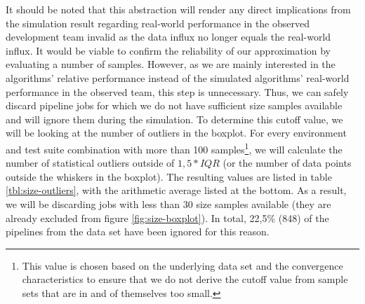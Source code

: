     It should be noted that this abstraction will render any direct implications from the simulation result regarding real-world performance in the observed development team invalid as the data influx no longer equals the real-world influx. It would be viable to confirm the reliability of our approximation by evaluating a number of samples. However, as we are mainly interested in the algorithms' relative performance instead of the simulated algorithms' real-world performance in the observed team, this step is unnecessary. Thus, we can safely discard pipeline jobs for which we do not have sufficient size samples available and will ignore them during the simulation. To determine this cutoff value, we will be looking at the number of outliers in the boxplot. For every environment and test suite combination with more than 100 samples\footnote{This value is chosen based on the underlying data set and the convergence characteristics to ensure that we do not derive the cutoff value from sample sets that are in and of themselves too small.}, we will calculate the number of statistical outliers outside of $1,5 * IQR$ (or the number of data points outside the whiskers in the boxplot). The resulting values are listed in table \ref{tbl:size-outliers}, with the arithmetic average listed at the bottom. As a result, we will be discarding jobs with less than 30 size samples available (they are already excluded from figure \ref{fig:size-boxplot}). In total, 22,5\% (848) of the pipelines from the data set have been ignored for this reason.\label{sec:abstraction-size-sampling}

